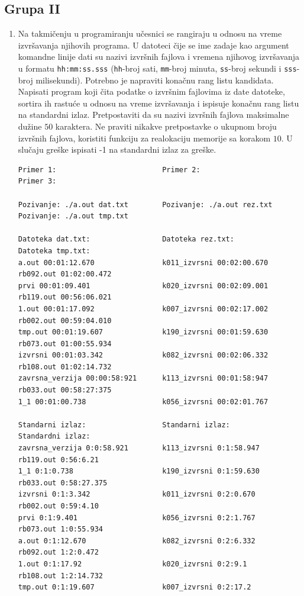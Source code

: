\subsection{Grupa II}

\begin{enumerate} 
\item Na takmičenju u programiranju učesnici se rangiraju u odnosu na vreme izvršavanja njihovih programa. U datoteci čije se ime zadaje kao argument komandne linije dati su nazivi izvršnih fajlova i vremena njihovog izvršavanja u formatu \texttt{hh:mm:ss.sss} (\texttt{hh}-broj sati, \texttt{mm}-broj minuta, \texttt{ss}-broj sekundi i \texttt{sss}-broj milisekundi). Potrebno je napraviti konačnu rang listu kandidata. Napisati program koji čita podatke o izvršnim fajlovima iz date datoteke, sortira ih rastuće u odnosu na vreme izvršavanja i ispisuje konačnu rang listu na standardni izlaz. Pretpostaviti da su nazivi izvršnih fajlova maksimalne dužine $50$ karaktera. 
Ne praviti nikakve pretpostavke o ukupnom broju izvršnih fajlova, 
koristiti funkciju za realokaciju memorije sa korakom $10$.  
U slučaju greške ispisati -1 na standardni izlaz za greške.

\begin{verbatim}
Primer 1:                         Primer 2:                           Primer 3:

Pozivanje: ./a.out dat.txt        Pozivanje: ./a.out rez.txt        Pozivanje: ./a.out tmp.txt

Datoteka dat.txt:                 Datoteka rez.txt:                 Datoteka tmp.txt:
a.out 00:01:12.670                k011_izvrsni 00:02:00.670         rb092.out 01:02:00.472
prvi 00:01:09.401                 k020_izvrsni 00:02:09.001         rb119.out 00:56:06.021 
1.out 00:01:17.092                k007_izvrsni 00:02:17.002         rb002.out 00:59:04.010
tmp.out 00:01:19.607              k190_izvrsni 00:01:59.630         rb073.out 01:00:55.934       
izvrsni 00:01:03.342              k082_izvrsni 00:02:06.332         rb108.out 01:02:14.732
zavrsna_verzija 00:00:58:921      k113_izvrsni 00:01:58:947         rb033.out 00:58:27:375
1_1 00:01:00.738                  k056_izvrsni 00:02:01.767

Standarni izlaz:                  Standarni izlaz:                  Standardni izlaz:
zavrsna_verzija 0:0:58.921        k113_izvrsni 0:1:58.947           rb119.out 0:56:6.21
1_1 0:1:0.738                     k190_izvrsni 0:1:59.630           rb033.out 0:58:27.375
izvrsni 0:1:3.342                 k011_izvrsni 0:2:0.670            rb002.out 0:59:4.10
prvi 0:1:9.401                    k056_izvrsni 0:2:1.767            rb073.out 1:0:55.934
a.out 0:1:12.670                  k082_izvrsni 0:2:6.332            rb092.out 1:2:0.472
1.out 0:1:17.92                   k020_izvrsni 0:2:9.1              rb108.out 1:2:14.732
tmp.out 0:1:19.607                k007_izvrsni 0:2:17.2


\end{verbatim}
\end{enumerate}
